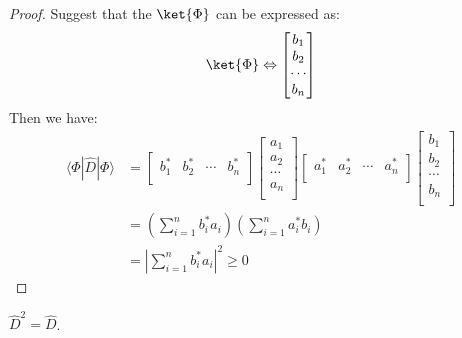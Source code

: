 \begin{proof}
Suggest that the $\ket{\Phi}$ can be expressed as:
\begin{equation}\label{}
\ket{\Phi} \Leftrightarrow
\begin{bmatrix}
b_{1} \\
b_{2} \\
\cdots   \\
b_{n} \\
\end{bmatrix}
\end{equation}
Then we have:
\begin{equation}\label{}
\begin{split}
  \langle\Phi|\hat{D}|\Phi\rangle &=
  \begin{bmatrix}
b_{1}^{*} & b_{2}^{*} & \cdots & b_{n}^{*} \\
\end{bmatrix}
  \begin{bmatrix}
a_{1} \\
a_{2} \\
\cdots   \\
a_{n} \\
\end{bmatrix}
\begin{bmatrix}
a_{1}^{*} & a_{2}^{*} & \cdots & a_{n}^{*} \\
\end{bmatrix}
  \begin{bmatrix}
b_{1} \\
b_{2} \\
\cdots   \\
b_{n} \\
\end{bmatrix} \\
    &=(\sum_{i=1}^{n}b_{i}^{*}a_{i})(\sum_{i=1}^{n}a_{i}^{*}b_{i})
    \\
    &=|\sum_{i=1}^{n}b_{i}^{*}a_{i}|^{2} \geq 0
\end{split}
\end{equation}
\qedhere
\end{proof}

\begin{theorem}\label{}
$\hat{D}^{2} = \hat{D}$.
\end{theorem}

